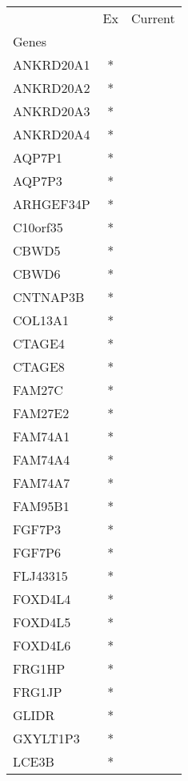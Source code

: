 \begin{tabular}{lcc}
\toprule
{} & Ex & Current \\
Genes              &    &         \\
\midrule
ANKRD20A1          &  * &         \\
ANKRD20A2          &  * &         \\
ANKRD20A3          &  * &         \\
ANKRD20A4          &  * &         \\
AQP7P1             &  * &         \\
AQP7P3             &  * &         \\
ARHGEF34P          &  * &         \\
C10orf35           &  * &         \\
CBWD5              &  * &         \\
CBWD6              &  * &         \\
CNTNAP3B           &  * &         \\
COL13A1            &  * &         \\
CTAGE4             &  * &         \\
CTAGE8             &  * &         \\
FAM27C             &  * &         \\
FAM27E2            &  * &         \\
FAM74A1            &  * &         \\
FAM74A4            &  * &         \\
FAM74A7            &  * &         \\
FAM95B1            &  * &         \\
FGF7P3             &  * &         \\
FGF7P6             &  * &         \\
FLJ43315           &  * &         \\
FOXD4L4            &  * &         \\
FOXD4L5            &  * &         \\
FOXD4L6            &  * &         \\
FRG1HP             &  * &         \\
FRG1JP             &  * &         \\
GLIDR              &  * &         \\
GXYLT1P3           &  * &         \\
LCE3B              &  * &         \\

\end{tabular}
